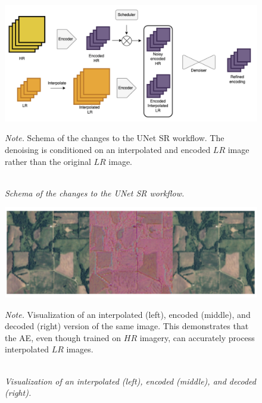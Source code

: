 \begin{figure}[H]
    \caption{\doublespacing \\ \textit{Schema of the changes to the UNet SR workflow.}} 
    \centering
    \includegraphics[width=1\linewidth]{images/simon/encLR_schema.png}
    \begin{justify}
        \textit{Note.} Schema of the changes to the UNet SR workflow. The denoising is conditioned on an interpolated and encoded $LR$ image rather than the original $LR$ image.
    \end{justify}                    
    \label{fig:encLR_schema}
\end{figure}

\begin{figure}[H]
    \caption{\doublespacing \\ \textit{Visualization of an interpolated (left), encoded (middle), and decoded (right).}} 
    \centering
    \includegraphics[width=1\linewidth]{images/simon/encLRint_demo.png}
    \begin{justify}
        \textit{Note.} Visualization of an interpolated (left), encoded (middle), and decoded (right) version of the same image. This demonstrates that the AE, even though trained on $HR$ imagery, can accurately process interpolated $LR$ images.
    \end{justify}                    
    \label{fig:encLRint_demo}
\end{figure}



